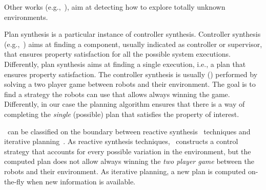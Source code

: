 \begin{enumerate*}
Other works (e.g.,~\cite{7139310}), aim at detecting how to explore totally unknown environments.
\item 
Plan synthesis is a particular instance of controller synthesis. 
Controller  synthesis (e.g.,~\cite{cassandras2009introduction,D'ippolito:2013:SNE:2430536.2430543}) aims at finding a component, usually indicated as controller or supervisor, that ensures property satisfaction for all the possible system executions.
Differently, plan synthesis aims at finding a single execution, i.e., a plan that ensures property satisfaction.
The controller synthesis  is usually (\cite{kress2009temporal,wongpiromsarn2009receding,chen2012ltl,livingston2012backtracking,guo2013revising}) performed by solving a two player game between robots and their environment.
The goal is to find a strategy the robots can use that allows always winning the game.
Differently, in our case the planning algorithm ensures that there is a way of completing the \emph{single} (possible) plan that satisfies the property of interest. 
\item \toolName\ can be classified on the boundary between reactive synthesis~\cite{chen2012ltl,livingston2012backtracking,thomas2002automata} techniques and iterative planning~\cite{guo2013revising,maly2013iterative}. 
As reactive synthesis techniques, \toolName\ constructs a control strategy that accounts for every possible variation in the environment, but the computed plan does not allow always winning the  \emph{two player game} between the robots and their environment.
As  iterative planning, a new plan is computed on-the-fly when new information is available.
\end{enumerate*}
